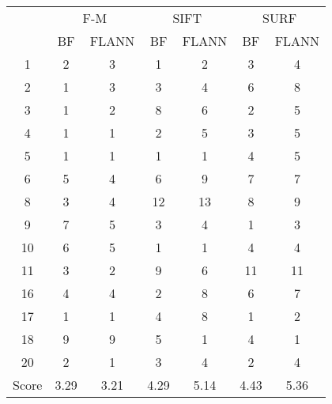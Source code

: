 \documentclass[draft,final]{vutinfth} %
\begin{document}
\begin{appendices}
\begin{minipage}{\linewidth}
 \label{tab:25Mean} 
\end{minipage}


\begin{minipage}{\linewidth}
\centering
\begin{tabular}{c|cc|cc|cc}
\multirow{2}{*}{ } & \multicolumn{2}{c}{ F-M } & \multicolumn{2}{c}{ SIFT } & \multicolumn{2}{c}{ SURF } \\
& BF & FLANN & BF & FLANN & BF & FLANN \\
\hline
1 & 2 & 3 & 1 & 2 & 3 & 4 \\
2 & 1 & 3 & 3 & 4 & 6 & 8 \\
3 & 1 & 2 & 8 & 6 & 2 & 5 \\
4 & 1 & 1 & 2 & 5 & 3 & 5 \\
5 & 1 & 1 & 1 & 1 & 4 & 5 \\
6 & 5 & 4 & 6 & 9 & 7 & 7 \\
8 & 3 & 4 & 12 & 13 & 8 & 9 \\
9 & 7 & 5 & 3 & 4 & 1 & 3 \\
10 & 6 & 5 & 1 & 1 & 4 & 4 \\
11 & 3 & 2 & 9 & 6 & 11 & 11 \\
16 & 4 & 4 & 2 & 8 & 6 & 7 \\
17 & 1 & 1 & 4 & 8 & 1 & 2 \\
18 & 9 & 9 & 5 & 1 & 4 & 1 \\
20 & 2 & 1 & 3 & 4 & 2 & 4 \\
\hline
Score & 3.29 & 3.21 & 4.29 & 5.14 & 4.43 & 5.36 \\
\end{tabular}
 \label{tab:25Cent} 
\end{minipage}


\end{appendices}
\end{document}
